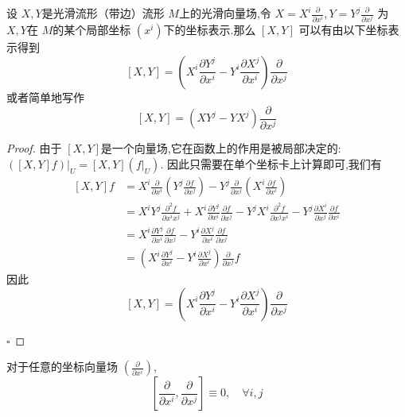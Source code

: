 \documentclass[../../几何与拓扑.tex]{subfiles}
\begin{document}
\begin{proposition}
    
设 \(  X,Y  \)是光滑流形（带边）流形 \(  M  \)上的光滑向量场,令 \(  X =  X^{i}\frac{\partial }{\partial x^{i}}  ,Y =  Y^{j}\frac{\partial }{\partial x^{j}}\)    为 \(  X,Y  \)在
\(  M  \)的某个局部坐标 \(  \left( x^{i} \right)   \)下的坐标表示.那么 \(  [X,Y]  \) 可以有由以下坐标表示得到 \[
[X,Y] =  \left( X^{i}\frac{\partial Y^{j}}{\partial x^{i}}-Y^{i}\frac{\partial X^{j}}{\partial x^{i}} \right)\frac{\partial }{\partial x^{j}} 
\]
或者简单地写作 \[
[X,Y] =  \left( XY^{j}-YX^{j} \right)\frac{\partial }{\partial x^{j}} 
\]
\end{proposition}

\begin{proof}
    由于 \(  [X,Y]  \)是一个向量场,它在函数上的作用是被局部决定的:\(  \left( [X,Y]f \right)|_{U} =  [X,Y]\left( f|_{U} \right)    \).
    因此只需要在单个坐标卡上计算即可,我们有 \[
    \begin{aligned}
    [X,Y]f &=  X^{i}\frac{\partial }{\partial x^{i}} \left( Y^{j} \frac{\partial f}{\partial x^{j}} \right)- Y^{j}\frac{\partial }{\partial x^{j}}\left( X^{i}\frac{\partial f}{\partial x^{i}} \right) \\ 
     & =  X^{i}Y^{j} \frac{\partial ^{2}f}{\partial x^{i}x^{j}} + X^{i} \frac{\partial Y^{j}}{\partial x^{i}} \frac{\partial f}{\partial x^{j}}- Y^{j}X^{i} \frac{\partial ^{2}f}{\partial x^{j}x^{i} }- Y^{j} \frac{\partial X^{i}}{\partial x^{j}} \frac{\partial f}{\partial x^{i}}\\ 
      & = X^{i} \frac{\partial Y^{j}}{\partial x^{i}} \frac{\partial f}{\partial x^{j}} - Y^{i} \frac{\partial X^{j}}{\partial x^{i}} \frac{\partial f}{\partial x^{j}}\\ 
       & =   \left(  X ^{i} \frac{\partial Y^{j}}{\partial x^{i}} -Y^{i} \frac{\partial X^{j}}{\partial x^{i}}\right) \frac{\partial }{\partial x^{j}} f 
    \end{aligned}
    \] 因此 \[
    [X,Y] =  \left( X^{i}\frac{\partial Y^{j}}{\partial x^{i}}-Y^{i}\frac{\partial X^{j}}{\partial x^{i}} \right) \frac{\partial }{\partial x^{j}} 
    \]

    \hfill $\square$
\end{proof}

\begin{corollary}
    对于任意的坐标向量场 \(  \left( \frac{\partial }{\partial x^{i}} \right)   \), \[
    \left[ \frac{\partial }{\partial x^{i}}, \frac{\partial }{\partial x^{j}} \right] \equiv 0,\quad  \forall  i,j
    \] 
\end{corollary}
\end{document}

